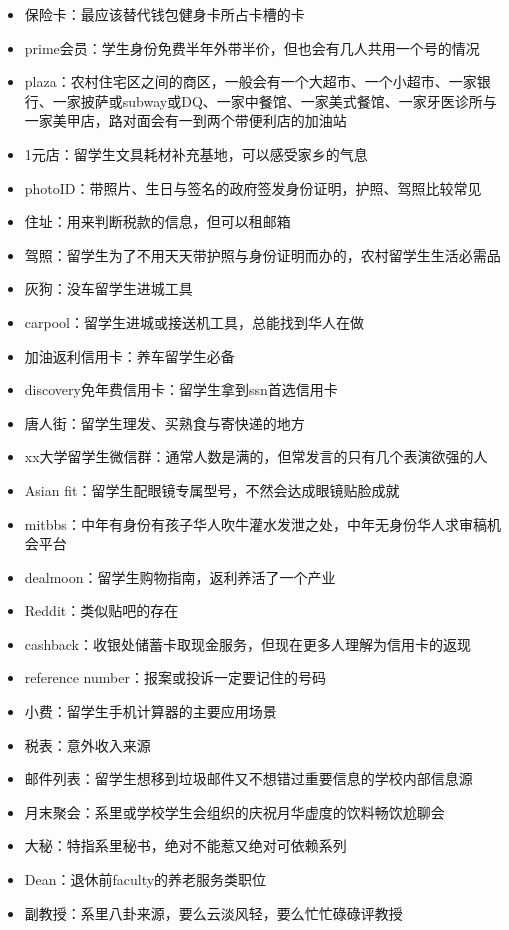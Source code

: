 \documentclass[]{tufte-book}
\begin{document}
\begin{itemize}
\item
  保险卡：最应该替代钱包健身卡所占卡槽的卡
\item
  prime会员：学生身份免费半年外带半价，但也会有几人共用一个号的情况
\item
  plaza：农村住宅区之间的商区，一般会有一个大超市、一个小超市、一家银行、一家披萨或subway或DQ、一家中餐馆、一家美式餐馆、一家牙医诊所与一家美甲店，路对面会有一到两个带便利店的加油站
\item
  1元店：留学生文具耗材补充基地，可以感受家乡的气息
\item
  photoID：带照片、生日与签名的政府签发身份证明，护照、驾照比较常见
\item
  住址：用来判断税款的信息，但可以租邮箱
\item
  驾照：留学生为了不用天天带护照与身份证明而办的，农村留学生生活必需品
\item
  灰狗：没车留学生进城工具
\item
  carpool：留学生进城或接送机工具，总能找到华人在做
\item
  加油返利信用卡：养车留学生必备
\item
  discovery免年费信用卡：留学生拿到ssn首选信用卡
\item
  唐人街：留学生理发、买熟食与寄快递的地方
\item
  xx大学留学生微信群：通常人数是满的，但常发言的只有几个表演欲强的人
\item
  Asian fit：留学生配眼镜专属型号，不然会达成眼镜贴脸成就
\item
  mitbbs：中年有身份有孩子华人吹牛灌水发泄之处，中年无身份华人求审稿机会平台
\item
  dealmoon：留学生购物指南，返利养活了一个产业
\item
  Reddit：类似贴吧的存在
\item
  cashback：收银处储蓄卡取现金服务，但现在更多人理解为信用卡的返现
\item
  reference number：报案或投诉一定要记住的号码
\item
  小费：留学生手机计算器的主要应用场景
\item
  税表：意外收入来源
\item
  邮件列表：留学生想移到垃圾邮件又不想错过重要信息的学校内部信息源
\item
  月末聚会：系里或学校学生会组织的庆祝月华虚度的饮料畅饮尬聊会
\item
  大秘：特指系里秘书，绝对不能惹又绝对可依赖系列
\item
  Dean：退休前faculty的养老服务类职位
\item
  副教授：系里八卦来源，要么云淡风轻，要么忙忙碌碌评教授

\end{itemize}
\end{document}
